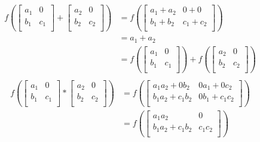 \documentclass{article}
\begin{document}
\begin{enumerate}
			\begin{align*}
				f\left({\begin{bmatrix}
					a_1 & 0 \\
					b_1 & c_1 \\
				\end{bmatrix} + \begin{bmatrix}
					a_2 & 0 \\
					b_2 & c_2 \\
				\end{bmatrix}}\right) & = f\left({\begin{bmatrix}
					a_1 + a_2 & 0 + 0 \\
					b_1 + b_2 & c_1 + c_2 \\
				\end{bmatrix}}\right) \\
					& = a_1 + a_2 \\
					& = f\left({\begin{bmatrix}
						a_1 & 0 \\
						b_1 & c_1 \\
					\end{bmatrix}}\right) + f\left({\begin{bmatrix}
						a_2 & 0 \\
						b_2 & c_2 \\
					\end{bmatrix}}\right) \\
			\end{align*}
			\begin{align*}
				f\left({\begin{bmatrix}
					a_1 & 0 \\
					b_1 & c_1 \\
				\end{bmatrix} * \begin{bmatrix}
					a_2 & 0 \\
					b_2 & c_2 \\
				\end{bmatrix}}\right) & = f\left({\begin{bmatrix}
					a_1a_2 + 0b_2 & 0a_1 + 0c_2 \\
					b_1a_2 + c_1b_2 & 0b_1 + c_1c_2 \\
				\end{bmatrix}}\right) \\
					& = f\left({\begin{bmatrix}
						a_1a_2 & 0 \\
						b_1a_2 + c_1b_2 & c_1c_2 \\
					\end{bmatrix}}\right) \\

\end{align*}
\end{enumerate}
\end{document}

